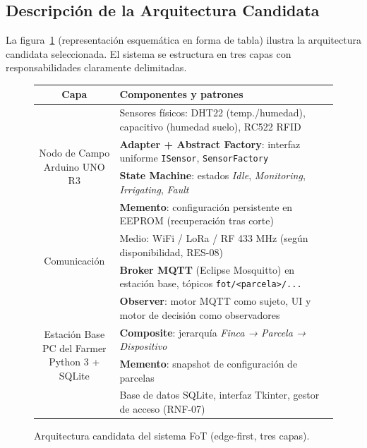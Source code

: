 \subsection{Descripción de la Arquitectura Candidata}
\label{sec:arq-desc}

La figura~\ref{fig:arq-candidata} (representación esquemática en forma de
tabla) ilustra la arquitectura candidata seleccionada. El sistema se
estructura en tres capas con responsabilidades claramente delimitadas.

\begin{figure}[htbp]
\centering
\caption{Arquitectura candidata del sistema FoT (edge-first, tres capas).}
\label{fig:arq-candidata}
\small
\renewcommand{\arraystretch}{1.5}
\begin{tabular}{|c|p{11cm}|}
\hline
\textbf{Capa} & \textbf{Componentes y patrones} \\
\hline
\multirow{4}{*}{\parbox{2.5cm}{\centering Nodo de Campo\\Arduino UNO R3}}
 & Sensores físicos: DHT22 (temp./humedad), capacitivo (humedad suelo), RC522 RFID \\
 & \textbf{Adapter + Abstract Factory}: interfaz uniforme \texttt{ISensor}, \texttt{SensorFactory} \\
 & \textbf{State Machine}: estados \textit{Idle}, \textit{Monitoring}, \textit{Irrigating}, \textit{Fault} \\
 & \textbf{Memento}: configuración persistente en EEPROM (recuperación tras corte) \\
\hline
\multirow{2}{*}{\parbox{2.5cm}{\centering Comunicación}}
 & Medio: WiFi / LoRa / RF 433 MHz (según disponibilidad, RES-08) \\
 & \textbf{Broker MQTT} (Eclipse Mosquitto) en estación base, tópicos \texttt{fot/<parcela>/...} \\
\hline
\multirow{4}{*}{\parbox{2.5cm}{\centering Estación Base\\PC del Farmer\\Python 3 + SQLite}}
 & \textbf{Observer}: motor MQTT como sujeto, UI y motor de decisión como observadores \\
 & \textbf{Composite}: jerarquía \textit{Finca → Parcela → Dispositivo} \\
 & \textbf{Memento}: snapshot de configuración de parcelas \\
 & Base de datos SQLite, interfaz Tkinter, gestor de acceso (RNF-07) \\
\hline
\end{tabular}
\end{figure}

